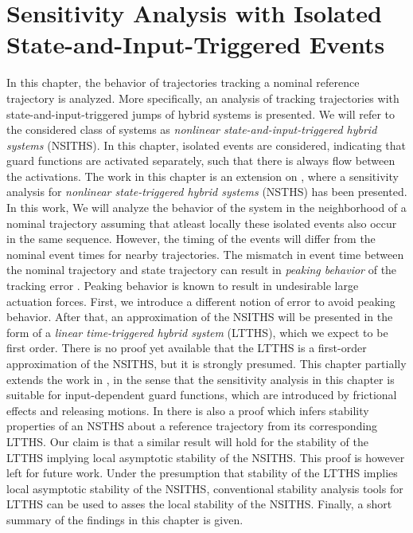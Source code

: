 \documentclass[../DC2017114Bouma.tex]{subfiles}
\begin{document}
\graphicspath{{03_Contribution/img/}}
\renewcommand{\chaptermark}[1]{\markboth{\thechapter.\ #1}{}}
\renewcommand{\sectionmark}[1]{\markright{#1}{}}

\pagestyle{fancyreport}
\cleartooddpage
\pagestyle{fancyreport}
\chapter{Sensitivity Analysis with Isolated State-and-Input-Triggered Events}\label{ch:order}
In this chapter, the behavior of trajectories tracking a nominal reference trajectory is analyzed. More specifically, an analysis of tracking trajectories with state-and-input-triggered jumps of hybrid systems is presented. We will refer to the considered class of systems as \textit{nonlinear state-and-input-triggered hybrid systems} (NSITHS). In this chapter, isolated events are considered, indicating that guard functions are activated separately, such that there is always flow between the activations. The work in this chapter is an extension on \cite{Saccon2014,Rijnen2017}, where a sensitivity analysis for \textit{nonlinear state-triggered hybrid systems} (NSTHS) has been presented. In this work, We will analyze the behavior of the system in the neighborhood of a nominal trajectory assuming that atleast locally these isolated events also occur in the same sequence. However, the timing of the events will differ from the nominal event times for nearby trajectories. The mismatch in event time between the nominal trajectory and state trajectory can result in \textit{peaking behavior} of the tracking error \cite{Menini2001,Biemond2013}. Peaking behavior is known to result in undesirable large actuation forces. First, we introduce a different notion of error to avoid peaking behavior. After that, an approximation of the NSITHS will be presented in the form of a \textit{linear time-triggered hybrid system} (LTTHS), which we expect to be first order. There is no proof yet available that the LTTHS is a first-order approximation of the NSITHS, but it is strongly presumed. This chapter partially extends the work in \cite{Rijnen2017}, in the sense that the sensitivity analysis in this chapter is suitable for input-dependent guard functions, which are introduced by frictional effects and releasing motions. In \cite{Rijnen2017} there is also a proof which infers stability properties of an NSTHS about a reference trajectory from its corresponding LTTHS. Our claim is that a similar result will hold for the stability of the LTTHS implying local asymptotic stability of the NSITHS. This proof is however left for future work. Under the presumption that stability of the LTTHS implies local asymptotic stability of the NSITHS, conventional stability analysis tools for LTTHS can be used to asses the local stability of the NSITHS. Finally, a short summary of the findings in this chapter is given.
%
%
\end{document}

